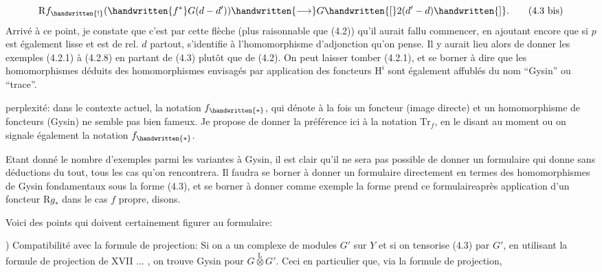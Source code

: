 \[
\mathrm{R}f_{\handwritten{!}}(\handwritten{f^*}G(d-d'))\handwritten{\longrightarrow}G\handwritten{[}2(d'-d)\handwritten{]}.
\tag*{(4.3 bis)}
\]
Arrivé à ce point, je constate que c'est par cette flèche (plus raisonnable que (4.2)) qu'il aurait fallu commencer, en ajoutant encore que si $p$ est également lisse et est de  rel. $d$ partout,  s'identifie à l'homomorphisme d'adjonction qu'on pense. Il y aurait lieu alors de donner les exemples (4.2.1) à (4.2.8)  en partant de (4.3) plutôt que de (4.2). On peut laisser tomber (4.2.1), et se borner à dire que les homomorphismes déduits des homomorphismes envisagés par application des foncteurs $\mathrm{H}^i$ sont également affublés du nom ``Gysin'' ou ``trace''.

 perplexité: dans le contexte actuel, la notation $f_{\handwritten{*}}$, qui dénote à la fois un foncteur (image directe) et un homomorphisme de foncteurs (Gysin) ne semble pas bien fameux. Je propose de donner la préférence ici à la notation $\mathrm{Tr}_f$, en le disant au moment ou on signale également la notation $f_{\handwritten{*}}$.

Etant donné le nombre d'exemples parmi les variantes à Gysin, il est clair qu'il ne sera pas possible de donner un formulaire qui donne  sans déductions du tout, tous les cas qu'on rencontrera. Il faudra se borner à donner un formulaire directement en termes des homomorphismes de Gysin fondamentaux sous la forme (4.3), et se borner à donner comme exemple la forme  prend ce formulaireaprès application d'un foncteur $\mathrm{R}g_*$ dans le cas $f$ propre, disons.

Voici des points qui doivent certainement figurer au formulaire:

) Compatibilité avec la formule de projection: Si on a un complexe de modules $G'$ sur $Y$ et si on tensorise (4.3) par $G'$, en utilisant la formule de projection de XVII ... , on trouve Gysin pour $G\overset{\mathrm{L}}{\otimes}G'$. Ceci  en particulier que, via la formule de projection,
